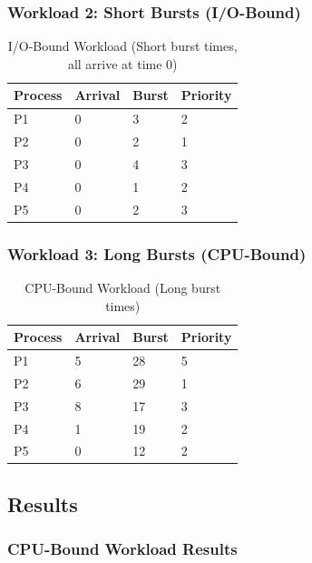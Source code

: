 \documentclass[12pt,letterpaper]{article}
\begin{document}
\subsubsection{Workload 2: Short Bursts (I/O-Bound)}
\begin{table}[H]
\centering
\caption{I/O-Bound Workload (Short burst times, all arrive at time 0)}
\begin{tabular}{@{}llll@{}}
\toprule
\textbf{Process} & \textbf{Arrival} & \textbf{Burst} & \textbf{Priority} \\ \midrule
P1 & 0 & 3 & 2 \\
P2 & 0 & 2 & 1 \\
P3 & 0 & 4 & 3 \\
P4 & 0 & 1 & 2 \\
P5 & 0 & 2 & 3 \\ \bottomrule
\end{tabular}
\end{table}

\subsubsection{Workload 3: Long Bursts (CPU-Bound)}
\begin{table}[H]
\centering
\caption{CPU-Bound Workload (Long burst times)}
\begin{tabular}{@{}llll@{}}
\toprule
\textbf{Process} & \textbf{Arrival} & \textbf{Burst} & \textbf{Priority} \\ \midrule
P1 & 5 & 28 & 5 \\
P2 & 6 & 29 & 1 \\
P3 & 8 & 17 & 3 \\
P4 & 1 & 19 & 2 \\
P5 & 0 & 12 & 2 \\ \bottomrule
\end{tabular}
\end{table}

\newpage

\subsection{Results}

\subsubsection{CPU-Bound Workload Results}
\end{document}
